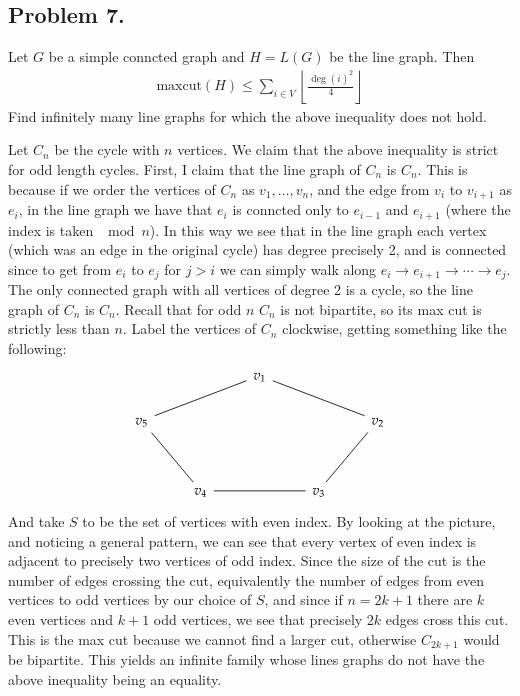 \documentclass[12pt]{article}
\theoremstyle{definitionstyle}
\newcommand{\floor}[1]{\left\lfloor#1\right\rfloor}
\begin{document}
    \subsection*{Problem 7.}
    Let $G$ be a simple conncted graph and $H = L(G)$ be the line graph. Then 
    \begin{align*}
        \mathrm{maxcut}(H) \leq \sum_{i \in V} \floor{\frac{\deg(i)^2}{4}}
    \end{align*}
    Find infinitely many line graphs for which the above inequality does not hold. 

    Let $C_n$ be the cycle with $n$ vertices. We claim that the above inequality is strict for odd length cycles. First, I claim that the line graph of $C_n$ is $C_n$. This is because if we order the vertices of $C_n$ as $v_1, \ldots, v_n$, and the edge from $v_i$ to $v_{i+1}$ as $e_i$, in the line graph we have that $e_i$ is conncted only to $e_{i-1}$ and $e_{i+1}$ (where the index is taken $\mod n$). In this way we see that in the line graph each vertex (which was an edge in the original cycle) has degree precisely 2, and is connected since to get from $e_i$ to $e_j$ for $j > i$ we can simply walk along $e_i \to e_{i+1} \to \cdots \to e_j$. The only connected graph with all vertices of degree 2 is a cycle, so the line graph of $C_n$ is $C_n$. Recall that for odd $n$ $C_n$ is not bipartite, so its max cut is strictly less than $n$. Label the vertices of $C_n$ clockwise, getting something like the following:
    \[\begin{tikzcd}
        && {v_1} \\
        {v_5} &&&& {v_2} \\
        \\
        & {v_4} && {v_3}
        \arrow[no head, from=1-3, to=2-1]
        \arrow[no head, from=1-3, to=2-5]
        \arrow[no head, from=2-1, to=4-2]
        \arrow[no head, from=2-5, to=4-4]
        \arrow[no head, from=4-2, to=4-4]
    \end{tikzcd}\]
    And take $S$ to be the set of vertices with even index. By looking at the picture, and noticing a general pattern, we can see that every vertex of even index is adjacent to precisely two vertices of odd index. Since the size of the cut is the number of edges crossing the cut, equivalently the number of edges from even vertices to odd vertices by our choice of $S$, and since if $n = 2k+1$ there are $k$ even vertices and $k+1$ odd vertices, we see that precisely $2k$ edges cross this cut. This is the max cut because we cannot find a larger cut, otherwise $C_{2k+1}$ would be bipartite. This yields an infinite family whose lines graphs do not have the above inequality being an equality.
\end{document}

